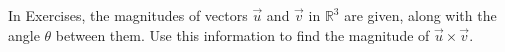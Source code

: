 \begin{exerciseset}{In Exercises}{, the magnitudes of vectors $\vec u$ and $\vec v$ in $\mathbb{R}^3$ are given, along with the angle $\theta$ between them. Use this information to find the magnitude of $\vec u\times\vec v$.}





\end{exerciseset}

